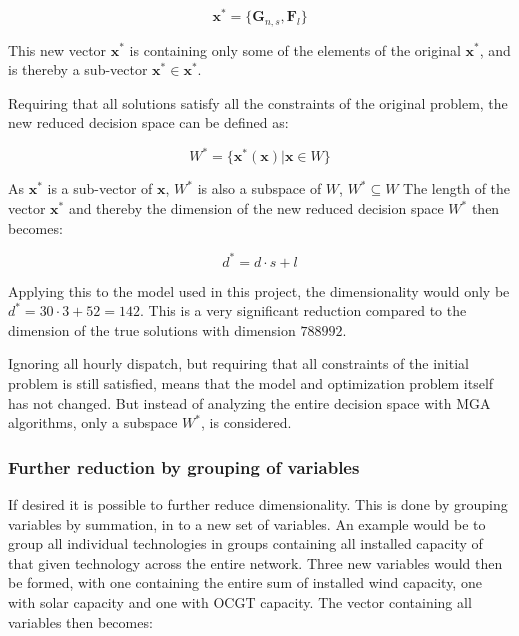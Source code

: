 \begin{equation}\label{eq:Optimization_variables_2}
\mathbf{x}^* = \{  \mathbf{G}_{n,s} , \mathbf{F}_{l} \}
\end{equation}

This new vector $\mathbf{x}^*$ is containing only some of the elements of the original $\mathbf{x}^*$, and is thereby a sub-vector $\mathbf{x}^*\in\mathbf{x}^*$. 

Requiring that all solutions satisfy all the constraints of the original problem, the new reduced decision space can be defined as:

\begin{equation}
W^* = \{ \mathbf{x}^*(\mathbf{x}) | \mathbf{x} \in W \}
\end{equation}

As $\mathbf{x}^*$ is a sub-vector of $\mathbf{x}$, $W^*$ is also a subspace of $W$, $W^*\subseteq W$ The length of the vector $\mathbf{x}^*$ and thereby the dimension of the new reduced decision space $W^*$ then becomes:

\begin{equation}
d^* = d\cdot s + l
\end{equation}

Applying this to the model used in this project, the dimensionality would only be $d^* = 30\cdot 3 + 52 = 142$. This is a very significant reduction compared to the dimension of the true solutions with dimension $788992$.

Ignoring all hourly dispatch, but requiring that all constraints of the initial problem is still satisfied, means that the model and optimization problem itself has not changed. But instead of analyzing the entire decision space with MGA algorithms, only a subspace $W^*$, is considered. 

\subsubsection{Further reduction by grouping of variables}
If desired it is possible to further reduce dimensionality. This is done by grouping variables by summation, in to a new set of variables. An example would be to group all individual technologies in groups containing all installed capacity of that given technology across the entire network. Three new variables would then be formed, with one containing the entire sum of installed wind capacity, one with solar capacity and one with OCGT capacity. The vector containing all variables then becomes: 


